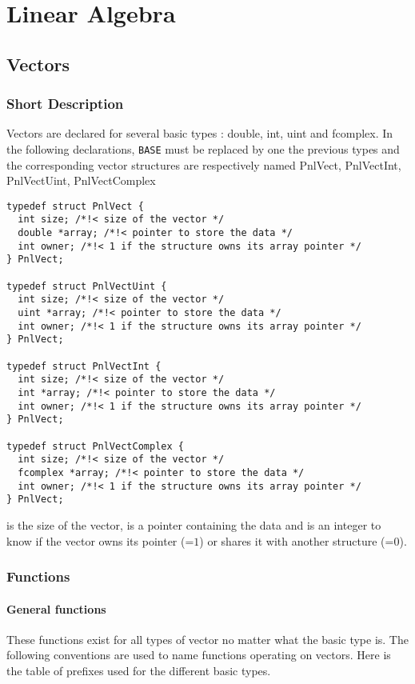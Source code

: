 \section{Linear Algebra}


\subsection{Vectors}
\subsubsection{Short Description}

Vectors are declared for several basic types : double, int, uint and
fcomplex. In the following declarations, {\tt BASE} must be replaced by one
the previous types and the corresponding vector structures are respectively
named PnlVect, PnlVectInt, PnlVectUint, PnlVectComplex
\begin{verbatim}
typedef struct PnlVect {
  int size; /*!< size of the vector */ 
  double *array; /*!< pointer to store the data */
  int owner; /*!< 1 if the structure owns its array pointer */
} PnlVect;

typedef struct PnlVectUint {
  int size; /*!< size of the vector */ 
  uint *array; /*!< pointer to store the data */
  int owner; /*!< 1 if the structure owns its array pointer */
} PnlVect;

typedef struct PnlVectInt {
  int size; /*!< size of the vector */ 
  int *array; /*!< pointer to store the data */
  int owner; /*!< 1 if the structure owns its array pointer */
} PnlVect;

typedef struct PnlVectComplex {
  int size; /*!< size of the vector */ 
  fcomplex *array; /*!< pointer to store the data */
  int owner; /*!< 1 if the structure owns its array pointer */
} PnlVect;
\end{verbatim}
 is the size of the vector,  is a pointer containing the
data and  is an integer to know if the vector owns its 
pointer (=$1$) or shares it with another structure (=$0$).

\subsubsection{Functions}

\paragraph{General functions}
These functions exist for all types of vector no matter what the basic type
is. The following conventions are used to name functions operating on vectors.
Here is the table of prefixes used for the different basic types.


